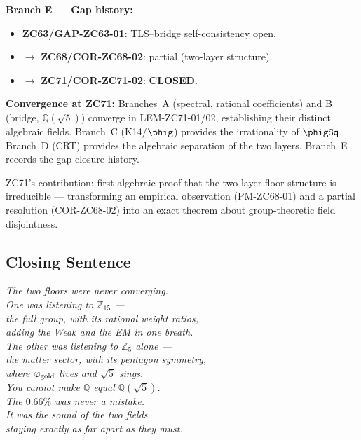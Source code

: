 \documentclass[12pt, a4paper]{article}
\begin{document}
\begin{genealogybox}[title={How ZC71's Key Objects Trace Back}]
\textbf{Branch E --- Gap history:}
\begin{itemize}[leftmargin=2em, noitemsep]
  \item \textbf{ZC63/GAP-ZC63-01}: TLS--bridge self-consistency open.
  \item $\to$ \textbf{ZC68/COR-ZC68-02}: partial (two-layer structure).
  \item $\to$ \textbf{ZC71/COR-ZC71-02}: \textbf{CLOSED}.
\end{itemize}

\textbf{Convergence at ZC71:}
Branches~A (spectral, rational coefficients) and B (bridge,
$\mathbb{Q}(\sqrt{5})$) converge in LEM-ZC71-01/02, establishing
their distinct algebraic fields.
Branch~C (K14/$\phig$) provides the irrationality of $\phigSq$.
Branch~D (CRT) provides the algebraic separation of the two layers.
Branch~E records the gap-closure history.

ZC71's contribution: first algebraic proof that the two-layer
floor structure is irreducible --- transforming an empirical
observation (PM-ZC68-01) and a partial resolution (COR-ZC68-02)
into an exact theorem about group-theoretic field disjointness.
\end{genealogybox}

\subsection{Closing Sentence}

\bigskip
\begin{center}
\textit{%
  The two floors were never converging.\\
  One was listening to $\mathbb{Z}_{15}$ ---\\
  the full group, with its rational weight ratios,\\
  adding the Weak and the EM in one breath.\\[0.5em]
  The other was listening to $\mathbb{Z}_5$ alone ---\\
  the matter sector, with its pentagon symmetry,\\
  where $\varphi_{\rm gold}$ lives and $\sqrt{5}$ sings.\\[0.5em]
  You cannot make $\mathbb{Q}$ equal $\mathbb{Q}(\sqrt{5})$.\\
  The $0.66\%$ was never a mistake.\\
  It was the sound of the two fields\\
  staying exactly as far apart as they must.
}
\end{center}
\end{document}
